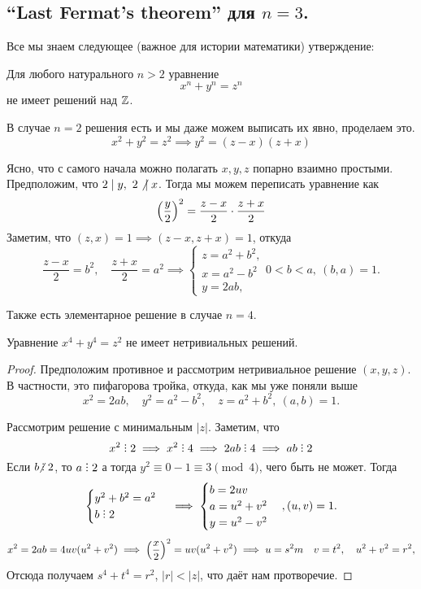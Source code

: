 	
	\subsection{``Last Fermat's theorem'' для $n = 3$.}

	Все мы знаем следующее (важное для истории математики) утверждение: 

	\begin{theorem} 
		Для любого натурального $n > 2$ уравнение 
		\[
		 	x^n + y^n = z^n
		 \] 
		 не имеет решений над $\Z$.
	\end{theorem}

	В случае $n = 2$ решения есть и мы даже можем выписать их явно, проделаем это.
	\[
		x^2 + y^2 = z^2 \implies y^2 = (z - x)(z + x)
	\]

	 Ясно, что с самого начала можно полагать $x, y, z$ попарно взаимно простыми. Предположим, что $2 \mid y, \ 2\not\ \mid x$. Тогда мы можем переписать уравнение как 
	\[
		\lr*{\frac{y}{2}}^2 = \frac{z - x}{2} \cdot \frac{z + x}{2}
 	\]
 	Заметим, что $(z, x) = 1 \implies (z - x, z + x) = 1$, откуда 
 	\[
 		\frac{z - x}{2} = b^2, \quad \frac{z + x}{2} = a^2 \implies \begin{cases} z = a^2 + b^2, \\ x = a^2 - b^2 \\ y = 2ab, \end{cases} 0 < b < a, \ (b, a) = 1. 
 	\]

 	Также есть элементарное решение в случае $n = 4$. 

 	\begin{statement} 
 		Уравнение $x^4 + y^4 = z^2$ не имеет нетривиальных решений.
 	\end{statement}
 	\begin{proof}
 		Предположим противное и рассмотрим нетривиальное решение $(x, y, z)$. В частности, это пифагорова тройка, откуда, как мы уже поняли выше 
 		\[
 			x^2 = 2ab, \quad y^2 = a^2 - b^2, \quad z = a^2 + b^2, \ (a, b) = 1.
 		\]

 		Рассмотрим решение с минимальным $|z|$. Заметим, что 
 		\[
 			x^2 \divby 2 \implies x^2 \divby 4 \implies 2ab \divby 4 \implies ab \divby 2 
 		\]
 		Если $b \notdivby 2$, то $a \divby 2$ а тогда $y^2 \equiv 0 - 1 \equiv 3 \pmod{4}$, чего быть не может. Тогда 
 		\[
 			\begin{cases} y^2 + b^2 = a^2 \\ b \divby 2 \end{cases} \implies \begin{cases} b = 2 u v \\ a = u^2 + v^2 \\ y = u^2 - v^2 \end{cases}, (u, v) = 1.
 		\]
 		\[
 			x^2 = 2ab = 4uv(u^2 + v^2) \implies \lr*{\frac{x}{2}}^2 = uv (u^2 + v^2) \implies u = s^2m \quad v = t^2, \quad u^2 + v^2 = r^2, 
 		\]
 		Отсюда получаем $s^4 + t^4 = r^2$, $|r| < |z|$, что даёт нам протворечие. 

 	\end{proof}

